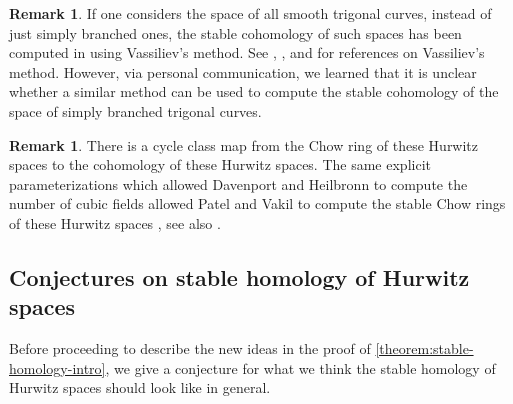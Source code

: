 \documentclass[12 pt]{amsart}
\theoremstyle{plain}
\theoremstyle{definition}
\newtheorem{remark}[theorem]{Remark}
\theoremstyle{remark}
\numberwithin{equation}{section}
\begin{document}
\begin{remark}
	\label{remark:}
	If one considers the space of all smooth trigonal curves, instead
of just simply branched ones, the stable cohomology of such spaces has been
computed in \cite{zheng:stable-cohomology-trigonal} using Vassiliev's method.
See \cite{tomassi:rational-cohomology-of-the-moduli-space},
	\cite{gorinov:real-cohomology}, and
\cite{vassiliev:how-to-calculuate} for references on Vassiliev's method.
However, via personal communication, we learned that it is
unclear whether a similar method can be used to compute the stable cohomology of
the space of simply branched trigonal curves.
\end{remark}
\begin{remark}
	\label{remark:}
	There is a cycle class map from the Chow ring of these Hurwitz spaces to
	the cohomology of these Hurwitz spaces. The same explicit
	parameterizations which allowed Davenport and Heilbronn
	\cite{davenportH:density-discriminants-cubica} to compute the
	number of cubic fields allowed Patel and Vakil to compute the stable
	Chow rings of these Hurwitz spaces
	\cite[Theorem C]{patel2015chow}, see also
	\cite{canningL:chow-rings-of-low-degree-hurwitz-spaces}.
\end{remark}

\subsection{Conjectures on stable homology of Hurwitz spaces}
Before proceeding to describe the new ideas in the proof of
\autoref{theorem:stable-homology-intro},
we give a conjecture for what we think the stable homology of Hurwitz spaces
should look like in general.
\end{document}
